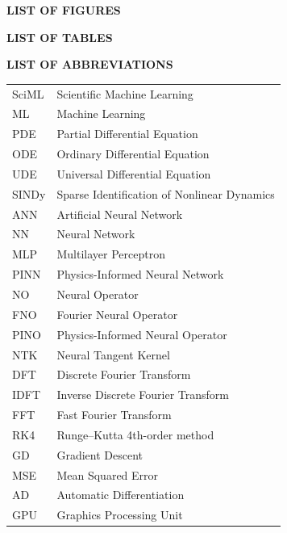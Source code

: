\pagebreak

\tableofcontents

\begin{center}
\textbf{LIST OF FIGURES}
\end{center}
{}
\makeatletter
{}
\makeatother

\pagebreak

\begin{center}
\textbf{LIST OF TABLES}
\end{center}
{}
\makeatletter
{}
\makeatother

\pagebreak

\begin{center}
\textbf{LIST OF ABBREVIATIONS}
\end{center}
{}

\vspace{0.5cm}
\noindent
\begin{tabular}{@{}p{2.6cm}p{12cm}@{}}
    SciML & Scientific Machine Learning \\[2pt]
    ML    & Machine Learning \\[2pt]
    PDE   & Partial Differential Equation \\[2pt]
    ODE   & Ordinary Differential Equation \\[2pt]
    UDE   & Universal Differential Equation \\[2pt]
    SINDy & Sparse Identification of Nonlinear Dynamics \\[2pt]
    ANN   & Artificial Neural Network \\[2pt]
    NN    & Neural Network \\[2pt]
    MLP   & Multilayer Perceptron \\[2pt]
    PINN  & Physics-Informed Neural Network \\[2pt]
    NO    & Neural Operator \\[2pt]
    FNO   & Fourier Neural Operator \\[2pt]
    PINO  & Physics-Informed Neural Operator \\[2pt]
    NTK   & Neural Tangent Kernel \\[2pt]
    DFT   & Discrete Fourier Transform \\[2pt]
    IDFT  & Inverse Discrete Fourier Transform \\[2pt]
    FFT   & Fast Fourier Transform \\[2pt]
    RK4   & Runge--Kutta 4th-order method \\[2pt]
    GD    & Gradient Descent \\[2pt]
    MSE   & Mean Squared Error \\[2pt]
    AD    & Automatic Differentiation \\[2pt]
    GPU   & Graphics Processing Unit \\
\end{tabular}

